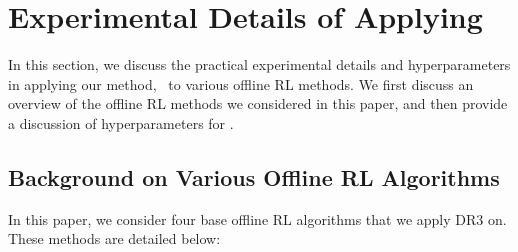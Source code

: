 
\section{Experimental Details of Applying \methodname}
\label{app:additional_background}

In this section, we discuss the practical experimental details and hyperparameters in applying our method, \methodname\ to various offline RL methods. We first discuss an overview of the offline RL methods we considered in this paper, and then provide a discussion of hyperparameters for \methodname.

\subsection{Background on Various Offline RL Algorithms}
\label{app:details_algo}

In this paper, we consider four base offline RL algorithms that we apply DR3 on. These methods are detailed below: 

